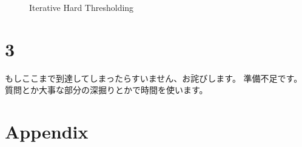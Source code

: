 \documentclass[a4paper, 14pt, dvipdfmx]{extarticle}
\begin{document}
\begin{figure}[H]
    \centering
    \caption{Iterative Hard Thresholding}
\end{figure}

\section*{3}

もしここまで到達してしまったらすいません、お詫びします。
準備不足です。
質問とか大事な部分の深掘りとかで時間を使います。

\appendix

\section*{Appendix}


\end{document}
